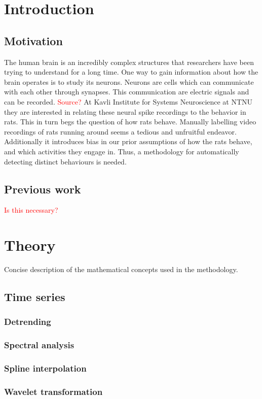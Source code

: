 \documentclass{article}
\theoremstyle{plain}
\theoremstyle{definition}
\theoremstyle{remark}
\begin{document}
\section{Introduction}
\subsection{Motivation}
The human brain is an incredibly complex structures that researchers have been trying to understand for a long time.
One way to gain information about how the brain operates is to study its neurons.
Neurons are cells which can communicate with each other through synapses.
This communication are electric signals and can be recorded.
\textcolor{red}{Source?}
At Kavli Institute for Systems Neuroscience at NTNU they are interested in relating these neural spike recordings to the behavior in rats.
This in turn begs the question of how rats behave.
Manually labelling video recordings of rats running around seems a tedious and unfruitful endeavor.
Additionally it introduces bias in our prior assumptions of how the rats behave, and which activities they engage in.
Thus, a methodology for automatically detecting distinct behaviours is needed.

\subsection{Previous work}
\textcolor{red}{Is this necessary?}


\section{Theory}
Concise description of the mathematical concepts used in the methodology.
\subsection{Time series}
\subsubsection{Detrending}
\subsubsection{Spectral analysis}
\subsubsection{Spline interpolation}
\subsubsection{Wavelet transformation}
\end{document}
